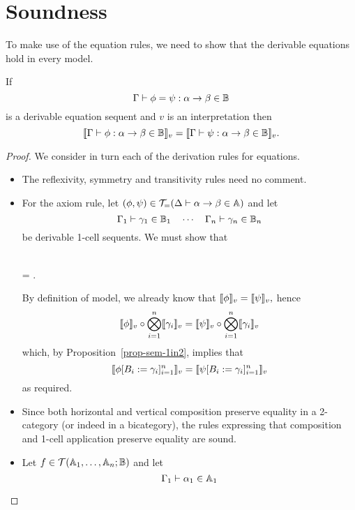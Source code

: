 \documentclass{robinthesisdraft}
\begin{document}
\section{Soundness}
To make use of the equation rules, we need to show that the derivable equations
hold in every model.
\begin{propn}[Soundness]
	If
	\[
		\Gamma\vdash\phi=\psi: \alpha\to\beta \in\mathbb{B}
	\]
	is a derivable equation sequent and $v$ is an interpretation
	then
	\[
		\llbracket \Gamma\vdash\phi: \alpha\to\beta \in\mathbb{B} \rrbracket_{v}
		=
		\llbracket \Gamma\vdash\psi: \alpha\to\beta \in\mathbb{B} \rrbracket_{v}.
	\]
\end{propn}
\begin{proof}
	We consider in turn each of the derivation rules for equations.
	\begin{itemize}
	\item The reflexivity, symmetry and transitivity rules need no comment.
	\item For the axiom rule, let $(\phi,\psi)\in{\mathcal{T}}_{=}(\Delta\vdash\alpha\to\beta\in\mathbb{A})$ and let
		\[
			\Gamma_{1} \vdash \gamma_{1}\in\mathbb{B}_{1}
			\quad\cdots\quad
			\Gamma_{n} \vdash \gamma_{n}\in\mathbb{B}_{n}
		\]
		be derivable 1-cell sequents. We must show that
		\begin{mmulti}
			\\ =
			.
		\end{mmulti}
		By definition of model, we already know that
		\(
			\semint{\phi}
			=
			\semint{\psi},
		\)
		hence
		\[
			\semint{\phi}
				\o
				\Tn_{i=1}^{n}
					\semint{\gamma_{i}}
			=
			\semint{\psi}
				\o
				\Tn_{i=1}^{n}
					\semint{\gamma_{i}}
		\]
		which, by Proposition~\ref{prop-sem-1in2}, implies that
		\[
			\semint{
				\phi[
					B_{i} := \gamma_{i}
				]_{i=1}^{n}
			}
			=
			\semint{
				\psi[
					B_{i} := \gamma_{i}
				]_{i=1}^{n}
			}
		\]
		as required.
	\item Since both horizontal and vertical composition preserve equality
		in a 2-category (or indeed in a bicategory), the rules expressing
		that composition and 1-cell application preserve equality are sound.
	\item Let $f\in{\mathcal{T}}(\mathbb{A}_{1},\dots,\mathbb{A}_{n};\mathbb{B})$ and let
		\[
			\Gamma_{1}\vdash \alpha_{1}\in \mathbb{A}_{1}
\]
\end{itemize}
\end{proof}
\end{document}
